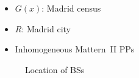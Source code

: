 \documentclass[aspectratio=169]{beamer}
\begin{document}
\begin{frame}
    \frametitle{\secname}
    \framesubtitle{\subsecname}

    \begin{minipage}{.48\textwidth}
        \begin{itemize}
            \item $G(x)$: Madrid census
            \item $R$: Madrid city
            \item Inhomogeneous Mattern~II PPs
        \end{itemize}
    \end{minipage}
    \begin{minipage}{.5\textwidth}
        \begin{figure}
            \centering
            \caption{Location of BSs}
            \label{fig:bs-location}
        \end{figure}
    \end{minipage}
\end{frame}
\end{document}
